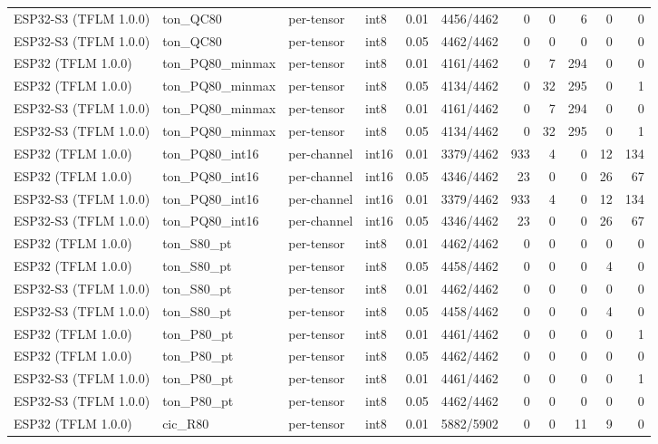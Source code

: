 \documentclass[10pt]{article}
\begin{document}
{\begin{longtable}{lllllrrrrrr}
ESP32-S3 (TFLM 1.0.0) & ton\_QC80 & per-tensor & int8 & 0.01 & 4456/4462 & 0 & 0 & 6 & 0 & 0 \\
ESP32-S3 (TFLM 1.0.0) & ton\_QC80 & per-tensor & int8 & 0.05 & 4462/4462 & 0 & 0 & 0 & 0 & 0 \\
ESP32 (TFLM 1.0.0) & ton\_PQ80\_minmax & per-tensor & int8 & 0.01 & 4161/4462 & 0 & 7 & 294 & 0 & 0 \\
ESP32 (TFLM 1.0.0) & ton\_PQ80\_minmax & per-tensor & int8 & 0.05 & 4134/4462 & 0 & 32 & 295 & 0 & 1 \\
ESP32-S3 (TFLM 1.0.0) & ton\_PQ80\_minmax & per-tensor & int8 & 0.01 & 4161/4462 & 0 & 7 & 294 & 0 & 0 \\
ESP32-S3 (TFLM 1.0.0) & ton\_PQ80\_minmax & per-tensor & int8 & 0.05 & 4134/4462 & 0 & 32 & 295 & 0 & 1 \\
ESP32 (TFLM 1.0.0) & ton\_PQ80\_int16 & per-channel & int16 & 0.01 & 3379/4462 & 933 & 4 & 0 & 12 & 134 \\
ESP32 (TFLM 1.0.0) & ton\_PQ80\_int16 & per-channel & int16 & 0.05 & 4346/4462 & 23 & 0 & 0 & 26 & 67 \\
ESP32-S3 (TFLM 1.0.0) & ton\_PQ80\_int16 & per-channel & int16 & 0.01 & 3379/4462 & 933 & 4 & 0 & 12 & 134 \\
ESP32-S3 (TFLM 1.0.0) & ton\_PQ80\_int16 & per-channel & int16 & 0.05 & 4346/4462 & 23 & 0 & 0 & 26 & 67 \\
ESP32 (TFLM 1.0.0) & ton\_S80\_pt & per-tensor & int8 & 0.01 & 4462/4462 & 0 & 0 & 0 & 0 & 0 \\
ESP32 (TFLM 1.0.0) & ton\_S80\_pt & per-tensor & int8 & 0.05 & 4458/4462 & 0 & 0 & 0 & 4 & 0 \\
ESP32-S3 (TFLM 1.0.0) & ton\_S80\_pt & per-tensor & int8 & 0.01 & 4462/4462 & 0 & 0 & 0 & 0 & 0 \\
ESP32-S3 (TFLM 1.0.0) & ton\_S80\_pt & per-tensor & int8 & 0.05 & 4458/4462 & 0 & 0 & 0 & 4 & 0 \\
ESP32 (TFLM 1.0.0) & ton\_P80\_pt & per-tensor & int8 & 0.01 & 4461/4462 & 0 & 0 & 0 & 0 & 1 \\
ESP32 (TFLM 1.0.0) & ton\_P80\_pt & per-tensor & int8 & 0.05 & 4462/4462 & 0 & 0 & 0 & 0 & 0 \\
ESP32-S3 (TFLM 1.0.0) & ton\_P80\_pt & per-tensor & int8 & 0.01 & 4461/4462 & 0 & 0 & 0 & 0 & 1 \\
ESP32-S3 (TFLM 1.0.0) & ton\_P80\_pt & per-tensor & int8 & 0.05 & 4462/4462 & 0 & 0 & 0 & 0 & 0 \\
ESP32 (TFLM 1.0.0) & cic\_R80 & per-tensor & int8 & 0.01 & 5882/5902 & 0 & 0 & 11 & 9 & 0 \\

\end{longtable}}
\end{document}
